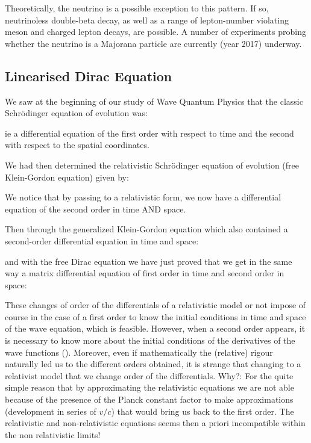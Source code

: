 	Theoretically, the neutrino is a possible exception to this pattern. If so, neutrinoless double-beta decay, as well as a range of lepton-number violating meson and charged lepton decays, are possible. A number of experiments probing whether the neutrino is a Majorana particle are currently (year 2017) underway.
	
	\pagebreak
	\subsection{Linearised Dirac Equation}\label{linearized dirac equation}
	We saw at the beginning of our study of Wave Quantum Physics that the classic Schrödinger equation of evolution was:
	
	ie a differential equation of the first order with respect to time and the second with respect to the spatial coordinates.

	We had then determined the relativistic Schrödinger equation of evolution (free Klein-Gordon equation) given by:
	
	We notice that by passing to a relativistic form, we now have a differential equation of the second order in time AND space.

	Then through the generalized Klein-Gordon equation which also contained a second-order differential equation in time and space:
	
	and with the free Dirac equation we have just proved that we get in the same way a matrix differential equation of first order in time and second order in space:
	
	These changes of order of the differentials of a relativistic model or not impose of course in the case of a first order to know the initial conditions in time and space of the wave equation, which is feasible. However, when a second order appears, it is necessary to know more about the initial conditions of the derivatives of the wave functions (). Moreover, even if mathematically the (relative) rigour naturally led us to the different orders obtained, it is strange that changing to a relativist model that we change order of the differentials. Why?: For the quite simple reason that by approximating the relativistic equations we are not able because of the presence of the Planck constant factor to make approximations (development in series of $v/c$) that would bring us back to the first order. The relativistic and non-relativistic equations seems then a priori incompatible within the non relativistic limits!
	
